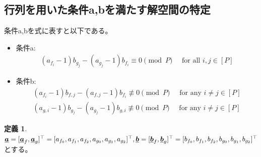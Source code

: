 \documentclass[a4paper,11pt,dvipdfmx]{jsarticle}
\theoremstyle{definition}
\newtheorem{definition}{定義}[section]
\begin{document}
\subsection{行列を用いた条件a,bを満たす解空間の特定}

条件a,bを式に表すと以下である。
\begin{itemize}
  \item 条件a:
  \begin{align}
    (a_{f_i} - 1)b_{g_j} - (a_{g_j} - 1)b_{f_i} \equiv 0 \pmod P \quad\text{ for all }i,j\in[P]
  \end{align}
  \item 条件b:
  \begin{align}
    (a_{f_i} - 1)b_{f,j} - (a_{f,j} - 1)b_{f_i} \not\equiv 0 \pmod P \quad\text{ for any }i\neq j\in[P]\\
    (a_{g,i} - 1)b_{g_j} - (a_{g_j} - 1)b_{g,i} \not\equiv 0 \pmod P \quad\text{ for any }i\neq j\in[P]
  \end{align}
\end{itemize}

\begin{definition}
$\underline{\bm{a}}=[\underline{\bm{a}}_f, \underline{\bm{a}}_g]^\top=[a_{f_0},a_{f_1},a_{f_2},a_{g_0},a_{g_1},a_{g_2}]^\top,\underline{\bm{b}}=[\underline{\bm{b}}_f, \underline{\bm{b}}_g]^\top=[b_{f_0},b_{f_1},b_{f_2},b_{g_0},b_{g_1},b_{g_2}]^\top$とする。
\end{definition}
\end{document}
